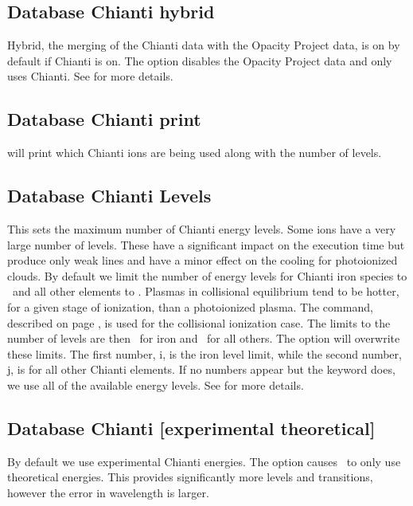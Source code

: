 \subsection{Database Chianti hybrid} 
Hybrid, the merging of the Chianti data with the Opacity Project data, 
is on by default if Chianti is on.
The  option disables the Opacity Project data and only uses Chianti.
See \citet{2013MNRAS.429.3133L} for more details.

\subsection{Database Chianti print} 
will print which Chianti ions are being used
along with the number of levels.
 
\subsection{Database Chianti Levels} 
\label{sec:AtomChiantiLevels}
This sets the maximum number of Chianti energy levels. 
Some ions have a very large number of levels.
These have a significant impact
on the execution time but produce only weak lines and have a minor effect
on the cooling for photoionized clouds.
By default we limit the number of energy levels for Chianti iron species to 
\nDefaultPhotoLevelsFe\ and all other elements to \nDefaultPhotoLevels.
Plasmas in collisional equilibrium tend to be hotter, for a given
stage of ionization, than a photoionized plasma.  
The  command, described on
page \pageref{sec:CommandCoronalEquilibrium}, is used for
the collisional ionization case.
The limits to the number of levels are then \nDefaultCollLevelsFe\ for iron 
and \nDefaultCollLevels\ for all others.
The  option will overwrite these limits.
The first number, i, is the iron level limit, while the second number, 
j, is for all other Chianti elements.
If no numbers appear but the keyword  does, we use all 
of the available energy levels.
See \citet{2013MNRAS.429.3133L} for more details.

\subsection{Database Chianti [experimental theoretical]}
\label{sec:AtomChiantiExperimental}
By default we use experimental Chianti energies.
The  option causes \Cloudy\ to only use theoretical 
energies.
This provides significantly more levels and transitions, 
however the error in wavelength is larger.

